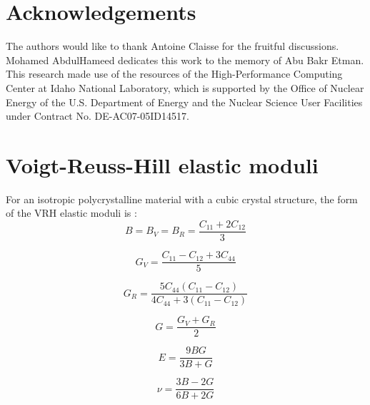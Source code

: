 \documentclass[preprint, 12pt]{elsarticle}
\begin{document}
\section*{Acknowledgements}

The authors would like to thank Antoine Claisse for the fruitful discussions. Mohamed AbdulHameed dedicates this work to the memory of Abu Bakr Etman. This research made use of the resources of the High-Performance Computing Center at Idaho National Laboratory, which is supported by the Office of Nuclear Energy of the U.S. Department of Energy and the Nuclear Science User Facilities under Contract No. DE-AC07-05ID14517.

\appendix

\section{Voigt-Reuss-Hill elastic moduli}
\label{appelas}
For an isotropic polycrystalline material with a cubic crystal structure, the form of the VRH elastic moduli is \cite{Anderson1963, Rosler2007}:
\begin{equation}
B = B_V = B_R = \frac{C_{11} + 2 C_{12}}{3}
\label{Eq:KV}
\end{equation}

\begin{equation}
G_V = \frac{C_{11}-C_{12}+3C_{44}}{5}
\label{Eq:GV}
\end{equation}

\begin{equation}
G_R = \frac{5 C_{44} \left( C_{11}-C_{12} \right) }{4 C_{44} + 3 \left( C_{11}-C_{12} \right)}
\label{Eq:GR}
\end{equation}

\begin{equation}
G = \frac{G_V + G_R}{2}
\end{equation}

\begin{equation}
E = \frac{9BG}{3B+G}
\end{equation}

\begin{equation}
\nu = \frac{3B-2G}{6B+2G}
\end{equation}
\end{document}
